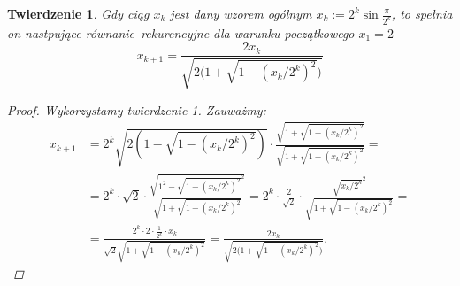 \documentclass[10pt,wide]{mwart}
\newtheorem{tw}{Twierdzenie}
\theoremstyle{definition}
\begin{document}
 \begin{tw}
Gdy ciąg \(x_k\) jest dany wzorem ogólnym \( x_k := 2^{k}\sin\frac{\pi}{2^k} \), to spełnia on nastpujące równanie rekurencyjne dla warunku początkowego \( x_1 = 2\)
  \begin{equation}
  x_{k+1} = \frac{2x_k}{\sqrt{2\big(1 + \sqrt{1 - (x_k/2^k)^2}\big)}}
  \end{equation}
  \begin{proof}
    Wykorzystamy twierdzenie 1. Zauważmy:
    \begin{equation*}
    \begin{split}
    x_{k+1} & = 2^{k}\sqrt{2(1 - \sqrt{1 - (x_{k}/2^{k})^2})} \cdot \frac{\sqrt{1 + \sqrt{1 - (x_{k}/2^{k})^2}}}{\sqrt{1 + \sqrt{1 - (x_{k}/2^{k})^2}}} = \\
    & = 2^{k}\cdot \sqrt{2} \cdot \frac{\sqrt{1^2 - \sqrt{1 - (x_{k}/2^{k})^2}^2}}{\sqrt{1 + \sqrt{1 - (x_{k}/2^{k})^2}}} = 2^{k} \cdot\frac{2}{\sqrt{2}} \cdot\frac{\sqrt{x_{k}/2^{k}}^2}{\sqrt{1 + \sqrt{1 - (x_{k}/2^{k})^2}}} = \\
    & = \frac{2^k \cdot 2 \cdot \frac{1}{2^k} \cdot x_k}{\sqrt{2}\sqrt{1 + \sqrt{1 - (x_{k}/2^{k})^2}}} = \frac{2x_k}{\sqrt{2\big(1 + \sqrt{1 - (x_k/2^k)^2}\big)}}.
    \end{split}
    \end{equation*}
  \end{proof}
\end{tw}
\end{document}
